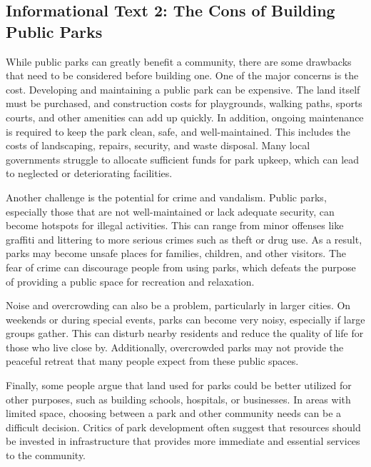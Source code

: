 \documentclass[12pt]{article}
\begin{document}
\vspace{1cm}


\subsection*{Informational Text 2: The Cons of Building Public Parks}

\begin{tcolorbox}[colframe=black!40, colback=gray!5]

\begin{spacing}{1.15}
    While public parks can greatly benefit a community, there are some drawbacks that need to be considered before building one. One of the major concerns is the cost. Developing and maintaining a public park can be expensive. The land itself must be purchased, and construction costs for playgrounds, walking paths, sports courts, and other amenities can add up quickly. In addition, ongoing maintenance is required to keep the park clean, safe, and well-maintained. This includes the costs of landscaping, repairs, security, and waste disposal. Many local governments struggle to allocate sufficient funds for park upkeep, which can lead to neglected or deteriorating facilities.

    Another challenge is the potential for crime and vandalism. Public parks, especially those that are not well-maintained or lack adequate security, can become hotspots for illegal activities. This can range from minor offenses like graffiti and littering to more serious crimes such as theft or drug use. As a result, parks may become unsafe places for families, children, and other visitors. The fear of crime can discourage people from using parks, which defeats the purpose of providing a public space for recreation and relaxation.

    Noise and overcrowding can also be a problem, particularly in larger cities. On weekends or during special events, parks can become very noisy, especially if large groups gather. This can disturb nearby residents and reduce the quality of life for those who live close by. Additionally, overcrowded parks may not provide the peaceful retreat that many people expect from these public spaces.

    Finally, some people argue that land used for parks could be better utilized for other purposes, such as building schools, hospitals, or businesses. In areas with limited space, choosing between a park and other community needs can be a difficult decision. Critics of park development often suggest that resources should be invested in infrastructure that provides more immediate and essential services to the community.

\end{spacing}

\end{tcolorbox}
\end{document}
